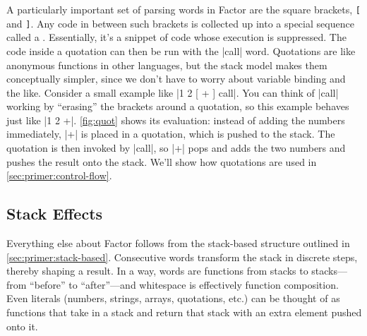 


A particularly important set of parsing words in Factor are the square
brackets, \Verb|[| and \Verb|]|.  Any code in between such brackets is
collected up into a special sequence called a .  Essentially,
it's a snippet of code whose execution is suppressed.  The code inside a
quotation can then be run with the \factor|call| word.  Quotations are like
anonymous functions in other languages, but the stack model makes them
conceptually simpler, since we don't have to worry about variable binding and
the like.  Consider a small example like \factor|1 2 [ + ] call|.  You can
think of \factor|call| working by ``erasing'' the brackets around a quotation,
so this example behaves just like \factor|1 2 +|.  \cref{fig:quot} shows its
evaluation: instead of adding the numbers immediately, \factor|+| is placed in
a quotation, which is pushed to the stack.  The quotation is then invoked by
\factor|call|, so \factor|+| pops and adds the two numbers and pushes the
result onto the stack.  We'll show how quotations are used in
\cref{sec:primer:control-flow}.

\subsection{Stack Effects}\label{sec:primer:effects}

Everything else about Factor follows from the stack-based structure outlined in
\cref{sec:primer:stack-based}.  Consecutive words transform the stack in
discrete steps, thereby shaping a result.  In a way, words are functions from
stacks to stacks---from ``before'' to ``after''---and whitespace is effectively
function composition.  Even literals (numbers, strings, arrays, quotations,
etc.) can be thought of as functions that take in a stack and return that stack
with an extra element pushed onto it.

